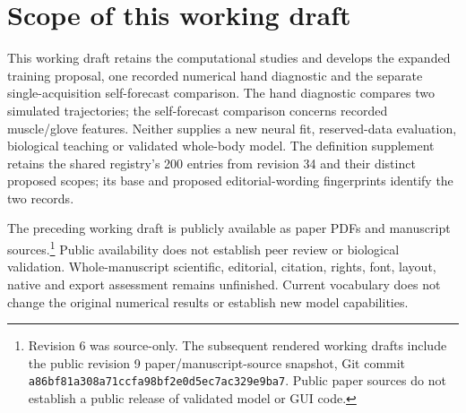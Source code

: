 \section*{Scope of this working draft}
This working draft retains the computational studies and develops the expanded
training proposal, one recorded numerical hand diagnostic and the separate single-acquisition self-forecast comparison. The hand diagnostic
compares two simulated trajectories; the self-forecast comparison concerns recorded muscle/glove features. Neither supplies a new neural fit,
reserved-data evaluation, biological teaching or validated whole-body model.
The definition supplement retains the shared registry's 200 entries from revision 34 and their distinct proposed scopes; its base and proposed editorial-wording fingerprints identify the two records.

The preceding working draft is publicly available as paper PDFs and manuscript
sources.\footnote{Revision 6 was source-only. The subsequent rendered working drafts include the public revision 9 paper/manuscript-source snapshot, Git commit
\nolinkurl{a86bf81a308a71ccfa98bf2e0d5ec7ac329e9ba7}. Public paper sources do not
establish a public release of validated model or GUI code.}
Public availability does not establish peer review or biological validation.
Whole-manuscript scientific, editorial, citation, rights, font, layout, native
and export assessment remains unfinished. Current vocabulary does not change
the original numerical results or establish new model capabilities.
